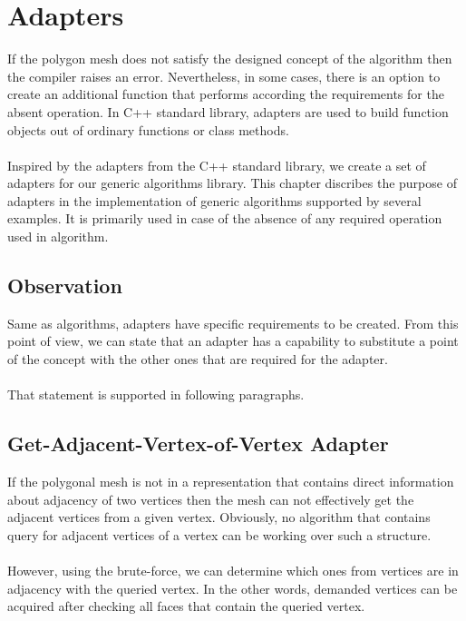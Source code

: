 \chapter{Adapters}
\label{chap:adapter_analysis}

If the polygon mesh does not satisfy the designed concept of the algorithm then the compiler
raises an error. Nevertheless, in some cases, there is an option to create an additional function
that performs according the requirements for the absent operation.
In C++ standard library, adapters are used to build function objects out of ordinary
functions or class methods\cite{Simonis2000}.\\
\\
Inspired by the adapters from the C++ standard library, we create a set of adapters
for our generic algorithms library.
This chapter discribes the purpose of adapters in the implementation of generic algorithms
supported by several examples. It is primarily used in case of the absence of any required operation
used in algorithm.

\section{Observation}

Same as algorithms, adapters have specific requirements to be created. From this point of view,
we can state that an adapter has a capability to substitute a point of the concept with
the other ones that are required for the adapter.\\
\\
That statement is supported in following paragraphs.

\section{Get-Adjacent-Vertex-of-Vertex Adapter}

If the polygonal mesh is not in a representation that contains direct information about adjacency of two
vertices then the mesh can not effectively 
get the adjacent vertices from a given vertex. Obviously, no algorithm that contains query for
adjacent vertices of a vertex can be working over such a structure.\\
\\
However, using the brute-force, we can determine which ones from vertices are in adjacency with
the queried vertex. In the other words, demanded vertices can be acquired after checking all
faces that contain the queried vertex.


